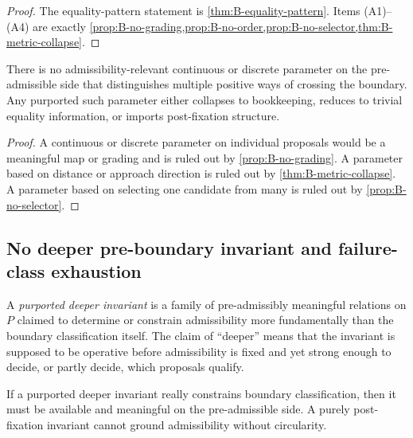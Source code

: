 \begin{proof}
The equality-pattern statement is \cref{thm:B-equality-pattern}. Items (A1)--(A4) are exactly \cref{prop:B-no-grading,prop:B-no-order,prop:B-no-selector,thm:B-metric-collapse}.
\end{proof}

\begin{corollary}
\label{cor:B-no-parameterization}
There is no admissibility-relevant continuous or discrete parameter on the pre-admissible side that distinguishes multiple positive ways of crossing the boundary. Any purported such parameter either collapses to bookkeeping, reduces to trivial equality information, or imports post-fixation structure.
\end{corollary}

\begin{proof}
A continuous or discrete parameter on individual proposals would be a meaningful map or grading and is ruled out by \cref{prop:B-no-grading}. A parameter based on distance or approach direction is ruled out by \cref{thm:B-metric-collapse}. A parameter based on selecting one candidate from many is ruled out by \cref{prop:B-no-selector}.
\end{proof}

\subsection{No deeper pre-boundary invariant and failure-class exhaustion}

\begin{definition}
A \emph{purported deeper invariant} is a family of pre-admissibly meaningful relations on $P$ claimed to determine or constrain admissibility more fundamentally than the boundary classification itself. The claim of ``deeper'' means that the invariant is supposed to be operative before admissibility is fixed and yet strong enough to decide, or partly decide, which proposals qualify.
\end{definition}

\begin{lemma}
\label{lem:B-preboundary}
If a purported deeper invariant really constrains boundary classification, then it must be available and meaningful on the pre-admissible side. A purely post-fixation invariant cannot ground admissibility without circularity.
\end{lemma}

